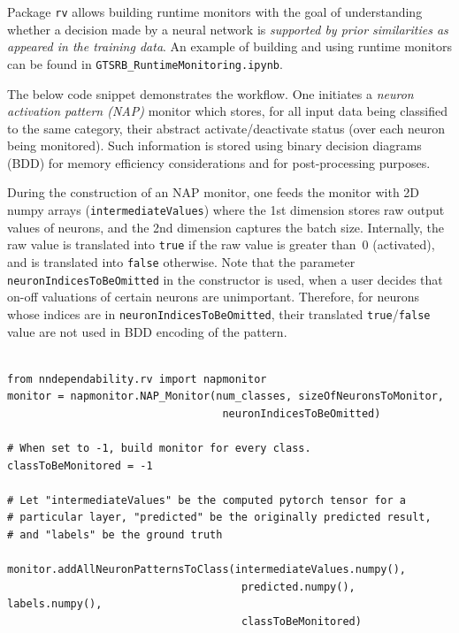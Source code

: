 \documentclass{article}
\begin{document}
Package \texttt{rv} allows building runtime monitors with the goal of understanding whether a decision made by a neural network is \emph{supported by prior similarities as appeared in the training data}. An example of building and using runtime monitors can be found in \texttt{GTSRB\_RuntimeMonitoring.ipynb}. 

\vspace{2mm}
 The below code snippet demonstrates the workflow. One initiates a \emph{neuron activation pattern (NAP)} monitor which stores, for all input data being classified to the same category, their abstract activate/deactivate status (over each neuron being monitored). Such information is stored using binary decision diagrams (BDD) for memory efficiency considerations and for  post-processing purposes.  



During the construction of an NAP monitor, one feeds the monitor with 2D numpy arrays (\texttt{intermediateValues}) where the 1st dimension stores raw output values of neurons,  and the 2nd dimension captures the batch size.  Internally, the raw value  is translated into \texttt{true} if the raw value is greater than~0 (activated), and is translated into \texttt{false} otherwise. Note that the parameter \texttt{neuronIndicesToBeOmitted} in the constructor is used, when a user decides that on-off valuations of certain neurons are unimportant. Therefore, for neurons whose indices are in  \texttt{neuronIndicesToBeOmitted}, their translated \texttt{true}/\texttt{false} value are not used in BDD encoding of the pattern.

\begin{small}
\color{blue}
\begin{verbatim}

from nndependability.rv import napmonitor
monitor = napmonitor.NAP_Monitor(num_classes, sizeOfNeuronsToMonitor,
                                  neuronIndicesToBeOmitted)

# When set to -1, build monitor for every class. 
classToBeMonitored = -1

# Let "intermediateValues" be the computed pytorch tensor for a 
# particular layer, "predicted" be the originally predicted result,
# and "labels" be the ground truth

monitor.addAllNeuronPatternsToClass(intermediateValues.numpy(),
                                     predicted.numpy(), labels.numpy(),
                                     classToBeMonitored) 


\end{verbatim}
\end{small}
\end{document}
